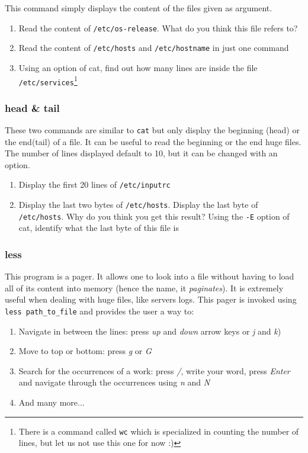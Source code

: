 \documentclass[12pt]{article}
\begin{document}
This command simply displays the content of the files given as argument.

\begin{enumerate}
\item Read the content of \texttt{/etc/os-release}. What do you think this file refers to?
\item Read the content of \texttt{/etc/hosts} and \texttt{/etc/hostname} in just one command
\item Using an option of cat, find out how many lines are inside the file \texttt{/etc/services}\footnote{There is a command called \texttt{wc} which is specialized in counting the number of lines, but let us not use this one for now :)}
\end{enumerate}

\subsubsection{head \& tail}

These two commands are similar to \texttt{cat} but only display the beginning (head) or the end(tail) of a file. It can be useful to read the beginning or the end huge files.
The number of lines displayed default to 10, but it can be changed with an option. 

\begin{enumerate}
\item Display the first 20 lines of \texttt{/etc/inputrc}
\item Display the last two bytes of \texttt{/etc/hosts}. Display the last byte of \texttt{/etc/hosts}. Why do you think you get this result? Using the \texttt{-E} option of cat, identify what the last byte of this file is
\end{enumerate}

\subsubsection{less}

This program is a pager. It allows one to look into a file without having to load all of its content into memory (hence the name, it \textit{paginates}). It is extremely useful when dealing with huge files, like servers logs.
This pager is invoked using \texttt{less path\_to\_file} and provides the user a way to:
\begin{enumerate}
\item Navigate in between the lines: press \textit{up} and \textit{down} arrow keys or \textit{j} and \textit{k})
\item Move to top or bottom: press \textit{g} or \textit{G}
\item Search for the occurrences of a work: press \textit{/}, write your word, press \textit{Enter} and navigate through the occurrences using \textit{n} and \textit{N}
\item And many more...
\end{enumerate} 
\end{document}
